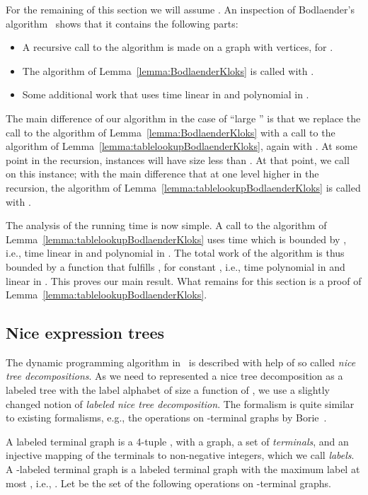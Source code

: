 \documentclass[a4paper,11pt]{article}
\theoremstyle{definition}
\theoremstyle{remark}
\begin{document}
For the remaining of this section we will assume .
An inspection of Bodlaender's algorithm~\cite{Bodlaender96} shows that it
contains the following parts:
\begin{itemize}
\item A recursive call to the algorithm is made on a graph with  vertices, for .
\item The algorithm of Lemma~\ref{lemma:BodlaenderKloks} is called
  with .
\item Some additional work that uses time linear in  and
  polynomial in .
\end{itemize}

The main difference of our algorithm in the case of ``large '' is
that we replace the call to the algorithm of
Lemma~\ref{lemma:BodlaenderKloks} with a call to the algorithm of
Lemma~\ref{lemma:tablelookupBodlaenderKloks}, again with .  At some point in the recursion, instances will have size less
than .  At that point, we call  on this
instance; with the main difference that at one level higher in the
recursion, the algorithm of
Lemma~\ref{lemma:tablelookupBodlaenderKloks} is called with .

The analysis of the running time is now simple.  A call to the
algorithm of Lemma~\ref{lemma:tablelookupBodlaenderKloks} uses time
which is bounded by , i.e., time linear in  and polynomial in .  The
total work of the algorithm is thus bounded by a function  that
fulfills , for
constant , i.e., time polynomial in  and linear in .  This
proves our main result.  What remains for this section is a proof of
Lemma~\ref{lemma:tablelookupBodlaenderKloks}.

\subsection{Nice expression trees}
The dynamic programming algorithm in~\cite{BodlaenderK96} is described
with help of so called {\em nice tree decompositions}.  As we need to
represented a nice tree decomposition as a labeled tree with the label
alphabet of size a function of , we use a slightly changed notion
of {\em labeled nice tree decomposition}.  The formalism is quite
similar to existing formalisms, e.g., the operations on -terminal
graphs by Borie~\cite{Borie88}.

A labeled terminal graph is a 4-tuple , with  a
graph,  a set of {\em terminals}, and  an injective mapping of the terminals to
non-negative integers, which we call {\em labels}.  A -labeled
terminal graph is a labeled terminal graph with the maximum label at
most , i.e., .  Let  be the set of
the following operations on -terminal graphs.
\end{document}
